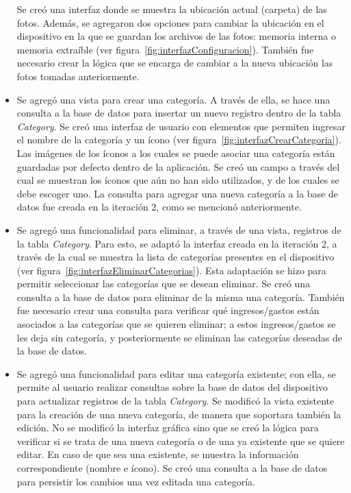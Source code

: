 \begin{itemize}
Se creó una interfaz donde se muestra la ubicación actual (carpeta) de las fotos. Además, se agregaron dos opciones para cambiar la ubicación en el dispositivo en la que se guardan los archivos de las fotos: memoria interna o memoria extraíble (ver figura~\ref{fig:interfazConfiguracion}). También fue necesario crear la lógica que se encarga de cambiar a la nueva ubicación las fotos tomadas anteriormente.
\item Se agregó una vista para crear una categoría. A través de ella, se hace una consulta a la base de datos para insertar un nuevo registro dentro de la tabla \textit{Category}. Se creó una interfaz de usuario con elementos que permiten ingresar el nombre de la categoría y un ícono (ver figura~\ref{fig:interfazCrearCategoria}). Las imágenes de los íconos a los cuales se puede asociar una categoría están guardadas por defecto dentro de la aplicación. Se creó un campo a través del cual se muestran los íconos que aún no han sido utilizados, y de los cuales se debe escoger uno. La consulta para agregar una nueva categoría a la base de datos fue creada en la iteración 2, como se mencionó anteriormente.
\item Se agregó una funcionalidad para eliminar, a través de una vista, registros de la tabla \textit{Category}. Para esto, se adaptó la interfaz creada en la iteración 2, a través de la cual se muestra la lista de categorías presentes en el dispositivo (ver figura~\ref{fig:interfazEliminarCategorias}). Esta adaptación se hizo para permitir seleccionar las categorías que se desean eliminar. Se creó una consulta a la base de datos para eliminar de la misma una categoría. También fue necesario crear una consulta para verificar qué ingresos/gastos están asociados a las categorías que se quieren eliminar; a estos ingresos/gastos se les deja sin categoría, y posteriormente se eliminan las categorías deseadas de la base de datos.
\item Se agregó una funcionalidad para editar una categoría existente; con ella, se permite al usuario realizar consultas sobre la base de datos del dispositivo para actualizar registros de la tabla \textit{Category}. Se modificó la vista existente para la creación de una nueva categoría, de manera que soportara también la edición. No se modificó la interfaz gráfica sino que se creó la lógica para verificar si se trata de una nueva categoría o de una ya existente que se quiere editar. En caso de que sea una existente, se muestra la información correspondiente (nombre e ícono). Se creó una consulta a la base de datos para persistir los cambios una vez editada una categoría.
\end{itemize}


